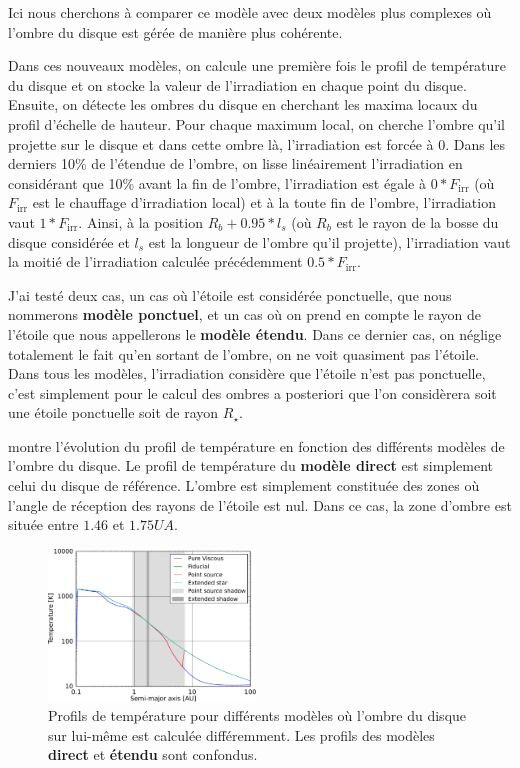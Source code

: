 Ici nous cherchons à comparer ce modèle avec deux modèles plus complexes où l'ombre du disque est gérée de manière plus cohérente. 

Dans ces nouveaux modèles, on calcule une première fois le profil de température du disque et on stocke la valeur de l'irradiation en chaque point du disque. Ensuite, on détecte les ombres du disque en cherchant les maxima locaux du profil d'échelle de hauteur. Pour chaque maximum local, on cherche l'ombre qu'il projette sur le disque et dans cette ombre là, l'irradiation est forcée à 0. Dans les derniers 10\% de l'étendue de l'ombre, on lisse linéairement l'irradiation en considérant que 10\% avant la fin de l'ombre, l'irradiation est égale à $0 * F_\text{irr}$ (où $F_\text{irr}$ est le chauffage d'irradiation local) et à la toute fin de l'ombre, l'irradiation vaut $1 * F_\text{irr}$. Ainsi, à la position $R_b + 0.95 * l_s$ (où $R_b$ est le rayon de la bosse du disque considérée et $l_s$ est la longueur de l'ombre qu'il projette), l'irradiation vaut la moitié de l'irradiation calculée précédemment $0.5 * F_\text{irr}$. 

J'ai testé deux cas, un cas où l'étoile est considérée ponctuelle, que nous nommerons \textbf{modèle ponctuel}, et un cas où on prend en compte le rayon de l'étoile que nous appellerons le \textbf{modèle étendu}. Dans ce dernier cas, on néglige totalement le fait qu'en sortant de l'ombre, on ne voit quasiment pas l'étoile. Dans tous les modèles, l'irradiation considère que l'étoile n'est pas ponctuelle, c'est simplement pour le calcul des ombres a posteriori que l'on considèrera soit une étoile ponctuelle soit de rayon $R_\star$.

 montre l'évolution du profil de température en fonction des différents modèles de l'ombre du disque. Le profil de température du \textbf{modèle direct} est simplement celui du disque de référence. L'ombre est simplement constituée des zones où l'angle de réception des rayons de l'étoile est nul. Dans ce cas, la zone d'ombre est située entre $1.46$ et $1.75\unit{UA}$.

\begin{figure}[htbp]
\centering
\includegraphics[width=0.49\textwidth]{figure/shadow/fiducial_temperature_profile.pdf}

\caption[Influence de l'ombre sur le profil de température]{Profils de température pour différents modèles où l'ombre du disque
sur lui-même est calculée différemment. Les profils des modèles \textbf{direct} et \textbf{étendu} sont confondus.
}\label{fig:shadow_temp_profile}
\end{figure}

